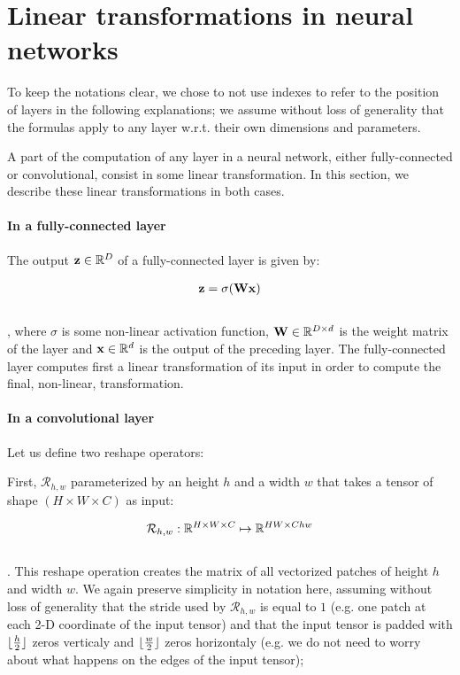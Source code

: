 \documentclass[12pt]{article}
\begin{document}
\section{Linear transformations in neural networks}

To keep the notations clear, we chose to not use indexes to refer to the position of layers in the following explanations; we assume without loss of generality that the formulas apply to any layer w.r.t. their own dimensions and parameters.

A part of the computation of any layer in a neural network, either fully-connected or convolutional, consist in some linear transformation. In this section, we describe these linear transformations in both cases.

\paragraph{In a fully-connected layer} The output ${\mathbf{z}} \in \mathbb{R}^D$ of a fully-connected layer is given by:

\begin{align}
    {\mathbf{z}} = \sigma({\mathbf{W}}{\mathbf{x}})
\end{align}
~\\
, where $\sigma$ is some non-linear activation function, ${\mathbf{W}} \in \mathbb{R}^{D \times d}$ is the weight matrix of the layer and ${\mathbf{x}} \in \mathbb{R}^d$ is the output of the preceding layer. The fully-connected layer computes first a linear transformation of its input in order to compute the final, non-linear, transformation.

\paragraph{In a convolutional layer} Let us define two reshape operators: 

First, $\mathcal{R}_{h, w}$ parameterized by an height $h$ and a width $w$ that takes a tensor of shape $(H \times W \times C)$ as input:

\begin{align}
\label{eq:fc_comp}
    \mathcal{R}_{h, w} : \mathbb{R}^{H \times W \times C} \mapsto \mathbb{R}^{HW \times Chw}
\end{align}
~ \\
. This reshape operation creates the matrix of all vectorized patches of height $h$ and width $w$. We again preserve simplicity in notation here, assuming without loss of generality that the stride used by $\mathcal{R}_{h, w}$ is equal to $1$ (e.g. one patch at each 2-D coordinate of the input tensor) and that the input tensor is padded with $\lfloor \frac{h}{2} \rfloor$ zeros verticaly and $\lfloor \frac{w}{2} \rfloor$ zeros horizontaly (e.g. we do not need to worry about what happens on the edges of the input tensor); 
\end{document}
